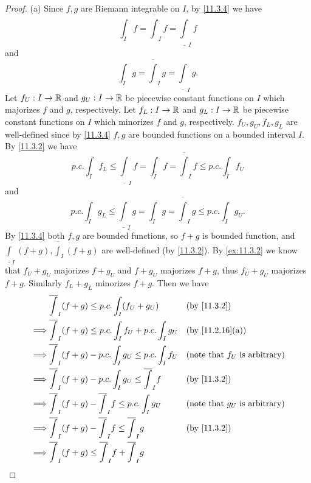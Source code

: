 \begin{proof}{(a)}
  Since \(f, g\) are Riemann integrable on \(I\), by \cref{11.3.4} we have
  \[
    \int_I f = \overline{\int}_I f = \underline{\int}_I f
  \]
  and
  \[
    \int_I g = \overline{\int}_I g = \underline{\int}_I g.
  \]
  Let \(f_U : I \to \mathbb{R}\) and \(g_U : I \to \mathbb{R}\) be piecewise constant functions on \(I\) which majorizes \(f\) and \(g\), respectively.
  Let \(f_L : I \to \mathbb{R}\) and \(g_L : I \to \mathbb{R}\) be piecewise constant functions on \(I\) which minorizes \(f\) and \(g\), respectively.
  \(f_U, g_U, f_L, g_L\) are well-defined since by \cref{11.3.4} \(f, g\) are bounded functions on a bounded interval \(I\).
  By \cref{11.3.2} we have
  \[
    p.c. \int_I f_L \leq \underline{\int}_I f = \int_I f = \overline{\int}_I f \leq p.c. \int_I f_U
  \]
  and
  \[
    p.c. \int_I g_L \leq \underline{\int}_I g = \int_I g = \overline{\int}_I g \leq p.c. \int_I g_U.
  \]
  By \cref{11.3.4} both \(f, g\) are bounded functions, so \(f + g\) is bounded function, and \(\underline{\int}_I (f + g), \overline{\int}_I (f + g)\) are well-defined (by \cref{11.3.2}).
  By \cref{ex:11.3.2} we know that \(f_U + g_U\) majorizes \(f + g_U\) and \(f + g_U\) majorizes \(f + g\), thus \(f_U + g_U\) majorizes \(f + g\).
  Similarly \(f_L + g_L\) minorizes \(f + g\).
  Then we have
  \begin{align*}
             & \overline{\int}_I (f + g) \leq p.c. \int_I (f_U + g_U)                   &   & \by{11.3.2}                             \\
    \implies & \overline{\int}_I (f + g) \leq p.c. \int_I f_U + p.c. \int_I g_U         &   & \by{11.2.16}[a]                         \\
    \implies & \overline{\int}_I (f + g) - p.c. \int_I g_U \leq p.c. \int_I f_U         &   & \text{(note that \(f_U\) is arbitrary)} \\
    \implies & \overline{\int}_I (f + g) - p.c. \int_I g_U \leq \overline{\int}_I f     &   & \by{11.3.2}                             \\
    \implies & \overline{\int}_I (f + g) - \overline{\int}_I f \leq p.c. \int_I g_U     &   & \text{(note that \(g_U\) is arbitrary)} \\
    \implies & \overline{\int}_I (f + g) - \overline{\int}_I f \leq \overline{\int}_I g &   & \by{11.3.2}                             \\
    \implies & \overline{\int}_I (f + g) \leq \overline{\int}_I f + \overline{\int}_I g &                                             \\

\end{align*}
\end{proof}
